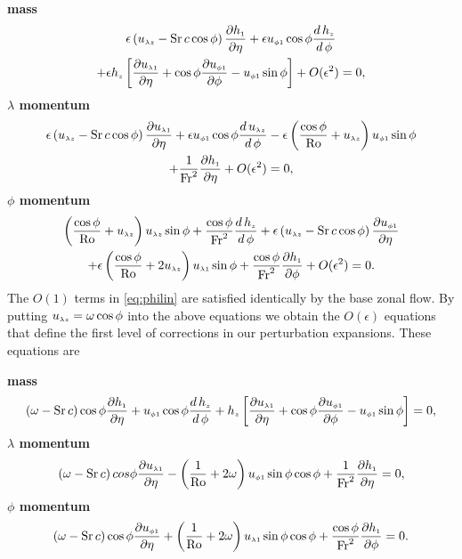 {\bfseries mass}
\begin{multline}
\epsilon\left(\ulamz-\mathrm{Sr}\,c\cos\phi\right)\dhpd{\eta} + \epsilon\uphip\cos\phi\frac{d \, \hz}{d \, \phi}\\+\epsilon\hz\left[\dulampd{\eta}+\cos\phi\duphipd{\phi}-\uphip\sin\phi\right]+ O(\epsilon^2)=0, \label{eq:masslin}
\end{multline}
{\bfseries \boldmath$\lambda$ momentum}
\begin{multline}
\epsilon\left(\ulamz-\mathrm{Sr}\,c\cos\phi\right)\dulampd{\eta} + \epsilon\uphip\cos\phi\frac{d \, \ulamz}{d \, \phi} - \epsilon\left(\frac{\cos\phi}{\mathrm{Ro}} + \ulamz \right)\uphip\sin\phi \\ + \frac{1}{\mathrm{Fr}^2}\dhpd{\eta} + O(\epsilon^2) = 0, \label{eq:lamlin}
\end{multline}
{\bfseries \boldmath$\phi$ momentum}
\begin{multline}
\left(\frac{\cos\phi}{\mathrm{Ro}}+\ulamz \right)\ulamz\sin\phi +   \frac{\cos\phi}{\mathrm{Fr}^2}\frac{d\,\hz}{d \, \phi} + \epsilon\left(\ulamz-\mathrm{Sr}\,c\cos\phi\right)\duphipd{\eta} \\+ \epsilon\left(\frac{\cos\phi}{\mathrm{Ro}} + 2\ulamz \right)\ulamp\sin\phi + \frac{\cos\phi}{\mathrm{Fr}^2}\dhpd{\phi} + O(\epsilon^2)= 0. \label{eq:philin}
\end{multline}
The $O(1)$ terms in \eqref{eq:philin} are satisfied identically by the base zonal flow. By putting $\ulamz=\omega\cos\phi$ into the above equations we obtain the $O(\epsilon)$ equations that define the first level of corrections in our perturbation expansions. These equations are

{\bfseries mass}
\begin{equation}
\left(\omega-\mathrm{Sr}\,c\right)\cos\phi\dhpd{\eta} + \uphip\cos\phi\frac{d \, \hz}{d \, \phi}+\hz\left[\dulampd{\eta}+\cos\phi\duphipd{\phi}-\uphip\sin\phi\right]=0, \label{eq:masslin1}
\end{equation}
{\bfseries \boldmath$\lambda$ momentum}
\begin{equation}
\left(\omega-\mathrm{Sr}\,c\right)cos\phi\dulampd{\eta} - \left(\frac{1}{\mathrm{Ro}} + 2\omega\right)\uphip\sin\phi\cos\phi + \frac{1}{\mathrm{Fr}^2}\dhpd{\eta} = 0, \label{eq:lamlin1}
\end{equation}
{\bfseries \boldmath$\phi$ momentum}
\begin{equation}
\left(\omega-\mathrm{Sr}\,c\right)\cos\phi\duphipd{\eta} + \left(\frac{1}{\mathrm{Ro}} + 2\omega \right)\ulamp\sin\phi\cos\phi + \frac{\cos\phi}{\mathrm{Fr}^2}\dhpd{\phi} = 0. \label{eq:philin1}
\end{equation}

